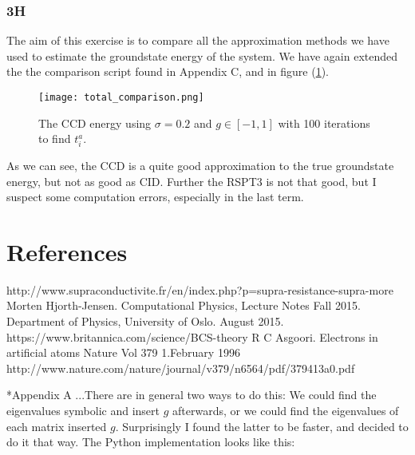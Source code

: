 \documentclass[norsk,a4paper,12pt]{article}
\begin{document}
\subsubsection*{3H}
The aim of this exercise is to compare all the approximation methods we have used to estimate the groundstate energy of the system. We have again extended the the comparison script found in Appendix C, and in figure (\ref{fig:total_comparison}).
\begin{figure}[H]
\centering
\texttt{[image: total\_comparison.png]}
\caption{The CCD energy using $\sigma=0.2$ and $g\in[-1,1]$ with 100 iterations to find $t_i^a$. \label{fig:total_comparison}}
\end{figure}
As we can see, the CCD is a quite good approximation to the true groundstate energy, but not as good as CID. Further the RSPT3 is not that good, but I suspect some computation errors, especially in the last term. 

\section{References}
\begingroup
\renewcommand{\section}[2]{}
\begin{thebibliography}{}
  http://www.supraconductivite.fr/en/index.php?p=supra-resistance-supra-more
  Morten Hjorth-Jensen.
  Computational Physics, Lecture Notes Fall 2015.
  Department of Physics, University of Oslo.
  August 2015.
  https://www.britannica.com/science/BCS-theory
  R C Asgoori. 
  Electrons in artificial atoms
  Nature Vol 379 1.February 1996
  http://www.nature.com/nature/journal/v379/n6564/pdf/379413a0.pdf
\end{thebibliography}
\endgroup

\section{Appendices}
\subsection*{Appendix A}
...There are in general two ways to do this: We could find the eigenvalues symbolic and insert $g$ afterwards, or we could find the eigenvalues of each matrix inserted $g$. Surprisingly I found the latter to be faster, and decided to do it that way. The Python implementation looks like this:

\end{document}

